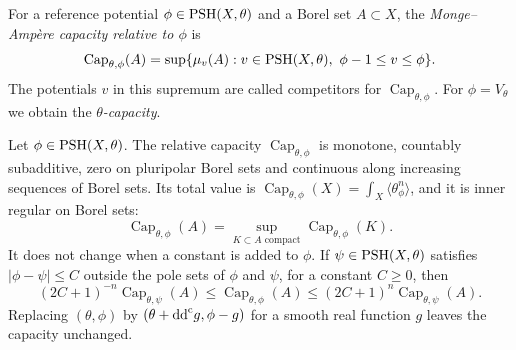 \begin{definition}\label{def:relative-monge-ampere-capacity}
For a reference potential $\phi\in\mathrm{PSH}(X,\theta)$ and a Borel set $A\subset X$, the \emph{Monge--Amp\`ere capacity relative to $\phi$} is
\[
 \operatorname{Cap}_{\theta,\phi}(A)
       =\sup\{\mu_v(A):v\in\mathrm{PSH}(X,\theta),\ \phi-1\leq v\leq\phi\}.
\]
The potentials $v$ in this supremum are called competitors for $\operatorname{Cap}_{\theta,\phi}$. For $\phi=V_\theta$ we obtain the \emph{$\theta$-capacity}.
\end{definition}

\begin{proposition}\label{prop:relative-capacity-basic}
Let $\phi\in\mathrm{PSH}(X,\theta)$. The relative capacity $\operatorname{Cap}_{\theta,\phi}$ is monotone, countably subadditive, zero on pluripolar Borel sets and continuous along increasing sequences of Borel sets. Its total value is $\operatorname{Cap}_{\theta,\phi}(X)=\int_X\langle\theta_\phi^n\rangle$, and it is inner regular on Borel sets:
\[
 \operatorname{Cap}_{\theta,\phi}(A)
       =\sup_{K\subset A\text{ compact}}\operatorname{Cap}_{\theta,\phi}(K).
\]
It does not change when a constant is added to $\phi$. If $\psi\in\mathrm{PSH}(X,\theta)$ satisfies $|\phi-\psi|\leq C$ outside the pole sets of $\phi$ and $\psi$, for a constant $C\geq0$, then
\[
 (2C+1)^{-n}\operatorname{Cap}_{\theta,\psi}(A)
  \leq\operatorname{Cap}_{\theta,\phi}(A)
  \leq(2C+1)^n\operatorname{Cap}_{\theta,\psi}(A).
\]
Replacing $(\theta,\phi)$ by $(\theta+\mathrm{dd}^{\mathrm{c}} g,\phi-g)$ for a smooth real function $g$ leaves the capacity unchanged.
\end{proposition}
